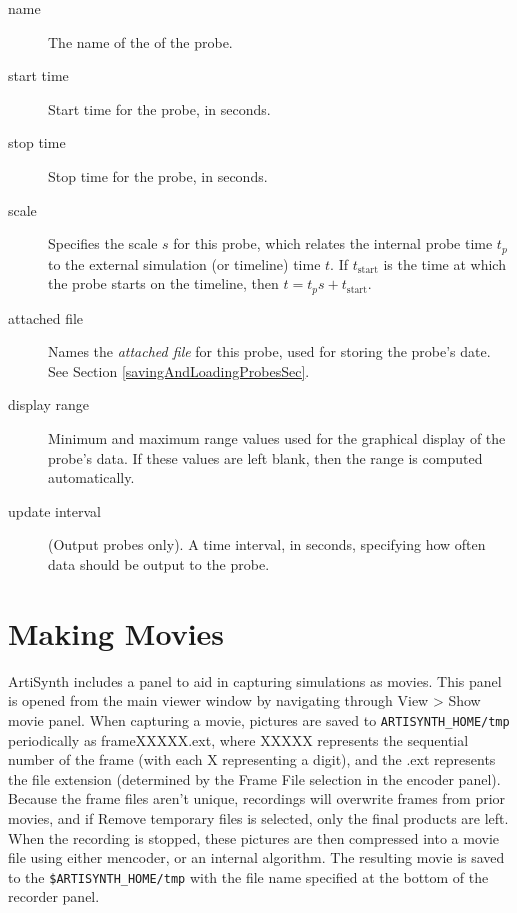\documentclass{article}
\begin{document}
\begin{description}

\item[name]\mbox{}

The name of the of the probe.

\item[start time]\mbox{}

Start time for the probe, in seconds.

\item[stop time]\mbox{}

Stop time for the probe, in seconds.

\item[scale]\mbox{}

Specifies the scale $s$ for this probe, which relates the internal probe 
time $t_p$ to the external simulation (or timeline) 
time $t$. If $t_\text{start}$ is the time
at which the probe starts on the timeline, then $t = t_p s + t_\text{start}$.

\item[attached file]\mbox{}

Names the {\it attached file} for this probe, used for
storing the probe's date. See Section \ref{savingAndLoadingProbesSec}.

\item[display range]\mbox{}

Minimum and maximum range values used for the graphical display
of the probe's data. If these values are left blank, then
the range is computed automatically.

\item[update interval]\mbox{}

(Output probes only). A time interval, in seconds, specifying
how often data should be output to the probe. 

\end{description}

\section{Making Movies}

ArtiSynth includes a panel to aid in capturing simulations as
movies. This panel is opened from the main viewer window by navigating
through {\sf View > Show movie panel}. When capturing a movie, pictures are
saved to {\tt ARTISYNTH\_HOME/tmp} periodically as frameXXXXX.ext, where
XXXXX represents the sequential number of the frame (with each X
representing a digit), and the .ext represents the file extension
(determined by the {\sf Frame File} selection in the encoder panel). Because
the frame files aren't unique, recordings will overwrite frames from
prior movies, and if {\sf Remove temporary files} is selected, only the final
products are left. When the recording is stopped, these pictures are then
compressed into a movie file using either mencoder, or an internal
algorithm. The resulting movie is saved to the {\tt \$ARTISYNTH\_HOME/tmp} with
the file name specified at the bottom of the recorder panel.
\end{document}
